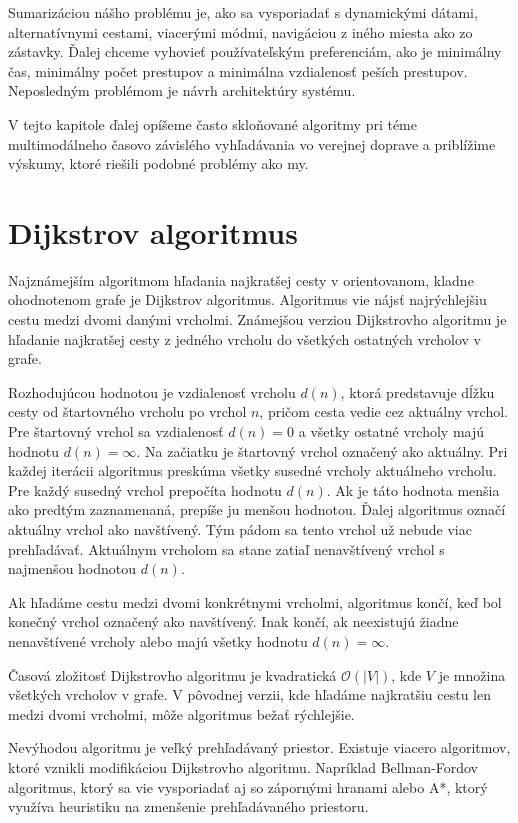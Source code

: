 Sumarizáciou nášho problému je, ako sa vysporiadať s dynamickými dátami, alternatívnymi cestami, viacerými módmi, navigáciou z iného miesta ako zo zástavky. Ďalej chceme vyhovieť používateľským preferenciám, ako je minimálny čas, minimálny počet prestupov a minimálna vzdialenosť peších prestupov. Neposledným problémom je návrh architektúry systému.

V tejto kapitole ďalej opíšeme často skloňované algoritmy pri téme multimodálneho časovo závislého vyhľadávania vo verejnej doprave a priblížime výskumy, ktoré riešili podobné problémy ako my.

\section{Dijkstrov algoritmus}
Najznámejším algoritmom hľadania najkratšej cesty v orientovanom, kladne ohodnotenom grafe je Dijkstrov algoritmus. Algoritmus vie nájsť najrýchlejšiu cestu medzi dvomi danými vrcholmi. Známejšou verziou Dijkstrovho algoritmu je hľadanie najkratšej cesty z jedného vrcholu do všetkých ostatných vrcholov v grafe. 

Rozhodujúcou hodnotou je vzdialenosť vrcholu $d(n)$, ktorá predstavuje dĺžku cesty od štartovného vrcholu po vrchol $n$, pričom cesta vedie cez aktuálny vrchol.
Pre štartovný vrchol sa vzdialenosť $d(n) = 0$ a všetky ostatné vrcholy majú hodnotu $d(n) = \infty$. Na začiatku je štartovný vrchol označený ako aktuálny. Pri každej iterácii algoritmus preskúma všetky susedné vrcholy aktuálneho vrcholu. Pre každý susedný vrchol prepočíta hodnotu $d(n)$. Ak je táto hodnota menšia ako predtým zaznamenaná, prepíše ju menšou hodnotou. Ďalej algoritmus označí aktuálny vrchol ako navštívený. Tým pádom sa tento vrchol už nebude viac prehľadávať. Aktuálnym vrcholom sa stane zatiaľ nenavštívený vrchol s najmenšou hodnotou $d(n)$. 

Ak hľadáme cestu medzi dvomi konkrétnymi vrcholmi, algoritmus končí, keď bol konečný vrchol označený ako navštívený. Inak končí, ak neexistujú žiadne nenavštívené vrcholy alebo majú všetky hodnotu $d(n) = \infty$.

Časová zložitosť Dijkstrovho algoritmu je kvadratická
$\mathcal{O}(|V|)$, kde $V$ je množina všetkých vrcholov v grafe. V pôvodnej verzii, kde hľadáme najkratšiu cestu len medzi dvomi vrcholmi, môže algoritmus bežať rýchlejšie.

Nevýhodou algoritmu je veľký prehľadávaný priestor. Existuje viacero algoritmov, ktoré vznikli modifikáciou Dijkstrovho algoritmu. Napríklad Bellman-Fordov algoritmus, ktorý sa vie vysporiadať aj so zápornými hranami alebo A*, ktorý využíva heuristiku na zmenšenie prehľadávaného priestoru. 

